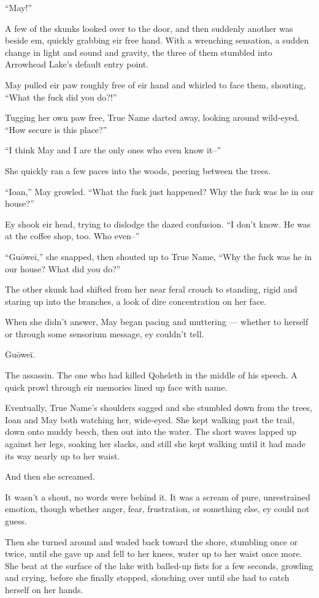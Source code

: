 ``May!''

A few of the skunks looked over to the door, and then suddenly another was beside em, quickly grabbing eir free hand. With a wrenching sensation, a sudden change in light and sound and gravity, the three of them stumbled into Arrowhead Lake's default entry point.

May pulled eir paw roughly free of eir hand and whirled to face them, shouting, ``What the fuck did you do?!''

Tugging her own paw free, True Name darted away, looking around wild-eyed. ``How secure is this place?''

``I think May and I are the only ones who even know it--''

She quickly ran a few paces into the woods, peering between the trees.

``Ioan,'' May growled. ``What the fuck just happened? Why the fuck was he in our house?''

Ey shook eir head, trying to dislodge the dazed confusion. ``I don't know. He was at the coffee shop, too. Who even--''

``Guōweī,'' she snapped, then shouted up to True Name, ``Why the fuck was he in our house? What did you do?''

The other skunk had shifted from her near feral crouch to standing, rigid and staring up into the branches, a look of dire concentration on her face.

When she didn't answer, May began pacing and muttering — whether to herself or through some sensorium message, ey couldn't tell.

Guōweī.

The assassin. The one who had killed Qoheleth in the middle of his speech. A quick prowl through eir memories lined up face with name.

Eventually, True Name's shoulders sagged and she stumbled down from the trees, Ioan and May both watching her, wide-eyed. She kept walking past the trail, down onto muddy beech, then out into the water. The short waves lapped up against her legs, soaking her slacks, and still she kept walking until it had made its way nearly up to her waist.

And then she screamed.

It wasn't a shout, no words were behind it. It was a scream of pure, unrestrained emotion, though whether anger, fear, frustration, or something else, ey could not guess.

Then she turned around and waded back toward the shore, stumbling once or twice, until she gave up and fell to her knees, water up to her waist once more. She beat at the surface of the lake with balled-up fists for a few seconds, growling and crying, before she finally stopped, slouching over until she had to catch herself on her hands.

